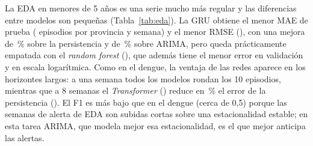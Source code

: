 La EDA en menores de 5 años es una serie mucho más regular y las diferencias entre modelos son pequeñas (Tabla~\ref{tab:eda}). La GRU obtiene el menor MAE de prueba (\nEGRUMAE{} episodios por provincia y semana) y el menor RMSE (\nEGRURMSE), con una mejora de \nredEPers\,\% sobre la persistencia y de \nredEArima\,\% sobre ARIMA, pero queda prácticamente empatada con el \textit{random forest} (\nERFMAE), que además tiene el menor error en validación y en escala logarítmica. Como en el dengue, la ventaja de las redes aparece en los horizontes largos: a una semana todos los modelos rondan los 10 episodios, mientras que a 8 semanas el \textit{Transformer} (\nEHOchoTr) reduce en \nredEHochoTrPers\,\% el error de la persistencia (\nEHOchoPers). El F1 es más bajo que en el dengue (cerca de 0,5) porque las semanas de alerta de EDA son subidas cortas sobre una estacionalidad estable; en esta tarea ARIMA, que modela mejor esa estacionalidad, es el que mejor anticipa las alertas.
